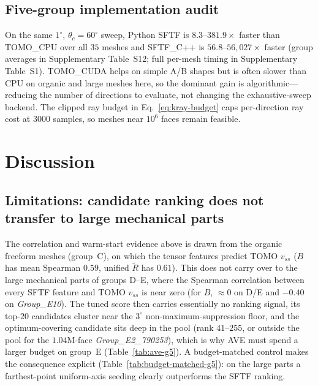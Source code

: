 \documentclass[12pt]{article}
\begin{document}
\subsection{Five-group implementation audit}
\label{sec:fivegroup}
On the same $1^\circ$, $\theta_c=60^\circ$ sweep, Python SFTF is $8.3$--$381.9\times$
faster than TOMO\_CPU over all $35$ meshes and SFTF\_C++ is $56.8$--$56{,}027\times$
faster (group averages in Supplementary Table~S12; full per-mesh timing in
Supplementary Table~S1). TOMO\_CUDA helps on simple A/B shapes but is often slower than
CPU on organic and large meshes here, so the dominant gain is algorithmic---reducing
the number of directions to evaluate, not changing the exhaustive-sweep backend. The
clipped ray budget in Eq.~\eqref{eq:kray-budget} caps per-direction ray cost at $3000$
samples, so meshes near $10^6$ faces remain feasible.

\section{Discussion}

\subsection{Limitations: candidate ranking does not transfer to large mechanical parts}
\label{sec:limits}
The correlation and warm-start evidence above is drawn from the organic freeform
meshes (group~C), on which the tensor features predict TOMO $v_{ss}$ ($B$ has mean
Spearman $0.59$, unified $\tilde R$ has $0.61$). This does not carry over to the large
mechanical parts of groups D--E, where the Spearman correlation between every SFTF
feature and TOMO $v_{ss}$ is near zero (for $B$, $\approx 0$ on D/E and $-0.40$ on
\emph{Group\_E10}). The tuned score then carries essentially no ranking signal, its
top-$20$ candidates cluster near the $3^\circ$ non-maximum-suppression floor, and the
optimum-covering candidate sits deep in the pool (rank $41$--$255$, or outside the pool
for the $1.04$M-face \emph{Group\_E2\_790253}), which is why AVE must spend a larger
budget on group~E (Table~\ref{tab:ave-g5}). A budget-matched control makes the
consequence explicit (Table~\ref{tab:budget-matched-g5}): on the large parts a
farthest-point uniform-axis seeding clearly outperforms the SFTF ranking.
\end{document}
